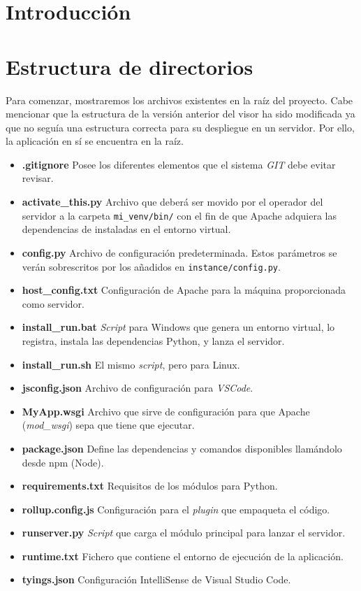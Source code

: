 
\section{Introducción}

\section{Estructura de directorios}
\noindent Para comenzar, mostraremos los archivos existentes en la raíz del proyecto. Cabe mencionar que la estructura de la versión anterior del visor ha sido modificada ya que no seguía una estructura correcta para su despliegue en un servidor. Por ello, la aplicación en sí se encuentra en la raíz.

\begin{itemize}
	\item \textbf{.gitignore} Posee los diferentes elementos que el sistema \textit{GIT} debe evitar revisar.
	\item \textbf{activate\_this.py} Archivo que deberá ser movido por el operador del servidor a la carpeta \texttt{mi\_venv/bin/} con el fin de que Apache adquiera las dependencias de instaladas en el entorno virtual.
	\item \textbf{config.py} Archivo de configuración predeterminada. Estos parámetros se verán sobrescritos por los añadidos en \texttt{instance/config.py}.
	\item \textbf{host\_config.txt} Configuración de Apache para la máquina proporcionada como servidor.
	\item \textbf{install\_run.bat} \textit{Script} para Windows que genera un entorno virtual, lo registra, instala las dependencias Python, y lanza el servidor.
	\item \textbf{install\_run.sh} El mismo \textit{script}, pero para Linux.
	\item \textbf{jsconfig.json} Archivo de configuración para \textit{VSCode}.
	\item \textbf{MyApp.wsgi} Archivo que sirve de configuración para que Apache (\textit{mod\_wsgi}) sepa que tiene que ejecutar.
	\item \textbf{package.json} Define las dependencias y comandos disponibles llamándolo desde npm (Node).
	\item \textbf{requirements.txt} Requisitos de los módulos para Python.
	\item \textbf{rollup.config.js} Configuración para el \textit{plugin} que empaqueta el código.
	\item \textbf{runserver.py} \textit{Script} que carga el módulo principal para lanzar el servidor.
	\item \textbf{runtime.txt} Fichero que contiene el entorno de ejecución de la aplicación.
	\item \textbf{tyings.json} Configuración IntelliSense de Visual Studio Code.
\end{itemize}

